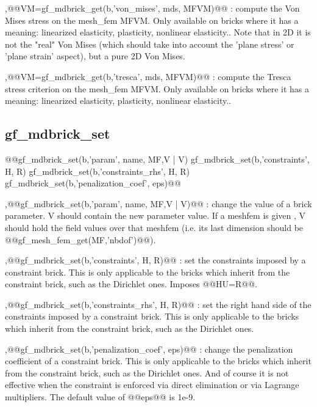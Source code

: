 \begin{cmddescription}
    \sep{@@VM=gf_mdbrick_get(b,'von_mises', mds, MFVM)@@} :
    compute the Von Mises stress on the mesh_fem MFVM.  Only available on bricks
    where it has a meaning: linearized elasticity, plasticity, nonlinear
    elasticity.. Note that in 2D it is not the "real" Von Mises (which should take
    into account the 'plane stress' or 'plane strain' aspect), but a pure 2D Von
    Mises.

    \sep{@@VM=gf_mdbrick_get(b,'tresca', mds, MFVM)@@} :
    compute the Tresca stress criterion on the mesh_fem MFVM.  Only available on
    bricks where it has a meaning: linearized elasticity,  plasticity, nonlinear
    elasticity..

\end{cmddescription}
\newpage


\subsection{gf\_mdbrick_set}
\begin{synopsis}
@@gf_mdbrick_set(b,'param', \tstr name, {\tmf MF,V | V})
gf_mdbrick_set(b,'constraints', \tspmat H, \tvec R)
gf_mdbrick_set(b,'constraints_rhs', \tspmat H, \tvec R)
gf_mdbrick_set(b,'penalization_coef', \tscal eps)@@
\end{synopsis}
\begin{cmddescription}
   \sep{@@gf_mdbrick_set(b,'param', name, {MF,V | V})@@} : 
    change the value of a brick parameter.  V should contain the new parameter
    value. If a meshfem is given , V should hold the field values over that
    meshfem (i.e. its last dimension should be @@gf_mesh_fem_get(MF,'nbdof')@@).

    \sep{@@gf_mdbrick_set(b,'constraints', H, R)@@} :
    set the constraints imposed by a constraint brick.  This is only applicable to
    the bricks which inherit from the constraint brick, such as the Dirichlet
    ones. Imposes @@HU=R@@.

    \sep{@@gf_mdbrick_set(b,'constraints_rhs', H, R)@@} :
    set the right hand side of the constraints imposed by a constraint brick.
    This is only applicable to the bricks which inherit from the constraint brick,
    such as the Dirichlet ones.

    \sep{@@gf_mdbrick_set(b,'penalization_coef', eps)@@} :
    change the penalization coefficient of a constraint brick.
    This is only applicable to the bricks which inherit from the
    constraint brick, such as the Dirichlet ones. And of course it
    is not effective when the constraint is enforced via direct
    elimination or via Lagrange multipliers. The default value of @@eps@@ is 1e-9.
\end{cmddescription}
\newpage

